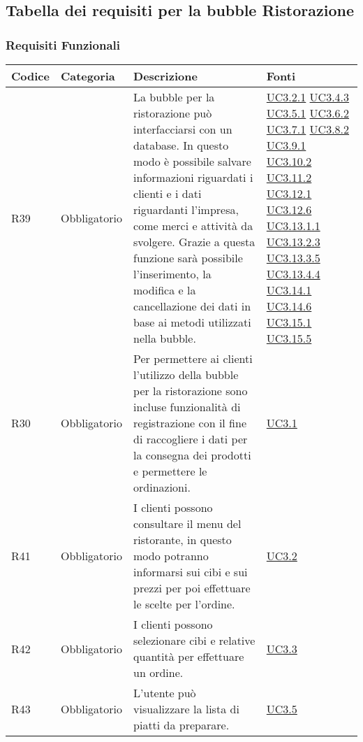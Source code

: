 \subsection{Tabella dei requisiti per la bubble Ristorazione}

\subsubsection{Requisiti Funzionali}

\begin{longtable}{|P{1.5cm}|P{3cm}|P{6cm}|P{2.5cm}|}
	\hline \textbf{Codice} & \textbf{Categoria} & \textbf{Descrizione} & \textbf{Fonti} \\
	\hline R39 & Obbligatorio & La bubble per la ristorazione può interfacciarsi con un database. In questo modo è possibile salvare informazioni riguardati i clienti e i dati riguardanti l’impresa, come merci e attività da svolgere. Grazie a questa funzione sarà possibile l’inserimento, la modifica e la cancellazione dei dati in base ai metodi utilizzati nella bubble. & \hyperref[UC3.2.1]{UC3.2.1} \hyperref[UC3.4.3]{UC3.4.3} \hyperref[UC3.5.1]{UC3.5.1} \hyperref[UC3.6.2]{UC3.6.2} \hyperref[UC3.7.1]{UC3.7.1} \hyperref[UC3.8.2]{UC3.8.2} \hyperref[UC3.9.1]{UC3.9.1} \hyperref[UC3.10.2]{UC3.10.2} \hyperref[UC3.11.2]{UC3.11.2} \hyperref[UC3.12.1]{UC3.12.1} \hyperref[UC3.12.6]{UC3.12.6} \hyperref[UC3.13.1.1]{UC3.13.1.1} \hyperref[UC3.13.2.3]{UC3.13.2.3} \hyperref[UC3.13.3.5]{UC3.13.3.5} \hyperref[UC3.13.4.4]{UC3.13.4.4} \hyperref[UC3.14.1]{UC3.14.1} \hyperref[UC3.14.6]{UC3.14.6} \hyperref[UC3.15.1]{UC3.15.1} \hyperref[UC3.15.5]{UC3.15.5} \\
	\hline R30 & Obbligatorio & Per permettere ai clienti l’utilizzo della bubble per la ristorazione sono incluse funzionalità di registrazione con il fine di raccogliere i dati per la consegna dei prodotti e permettere le ordinazioni. & \hyperref[UC3.1]{UC3.1} \\
	\hline R41 & Obbligatorio & I clienti possono consultare il menu del ristorante, in questo modo potranno informarsi sui cibi e sui prezzi per poi effettuare le scelte per l’ordine. & \hyperref[UC3.2]{UC3.2} \\
	\hline R42 & Obbligatorio & I clienti possono selezionare cibi e relative quantità per effettuare un ordine. & \hyperref[UC3.3]{UC3.3} \\
	\hline R43 & Obbligatorio & L’utente  può visualizzare la lista di piatti da preparare. & \hyperref[UC3.5]{UC3.5} \\

\end{longtable}
